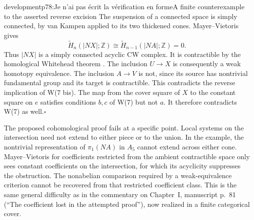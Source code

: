 \begin{dcomment}{development}{p78:Je n'ai pas écrit la vérification en forme}{A finite counterexample to the asserted reverse excision}
The suspension of a connected space is simply connected, by van Kampen applied to its two thickened cones. Mayer--Vietoris gives
\[
 \widetilde H_n(|NX|;\mathbb Z)
       \cong\widetilde H_{n-1}(|NA|;\mathbb Z)=0.
\]
Thus $|NX|$ is a simply connected acyclic CW complex. It is contractible by the homological Whitehead theorem \citep[Corollary~4.33]{Hatcher2002}. The inclusion $U\to X$ is consequently a weak homotopy equivalence. The inclusion $A\to V$ is not, since its source has nontrivial fundamental group and its target is contractible. This contradicts the reverse implication of W(7 bis). The map from the cover square of $X$ to the constant square on $e$ satisfies conditions $b,c$ of W(7) but not $a$. It therefore contradicts W(7) as well.\hfill$\square$

The proposed cohomological proof fails at a specific point. Local systems on the intersection need not extend to either piece or to the union. In the example, the nontrivial representation of $\pi_1(NA)$ in $A_5$ cannot extend across either cone. Mayer--Vietoris for coefficients restricted from the ambient contractible space only sees constant coefficients on the intersection, for which its acyclicity suppresses the obstruction. The nonabelian comparison required by a weak-equivalence criterion cannot be recovered from that restricted coefficient class. This is the same general difficulty as in the commentary on Chapter~I, manuscript p.~81 (``The coefficient lost in the attempted proof''), now realized in a finite categorical cover.
\end{dcomment}

